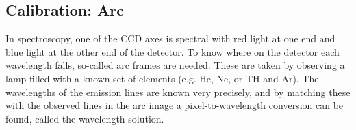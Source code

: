 \documentclass[a4paper,oneside,12pt, class=Latex/Classes/PhDthesisPSnPDF, crop=false]{standalone}
\begin{document}

\subsection{Calibration: Arc}
In spectroscopy, one of the CCD axes is spectral with red light at one end and blue light at the other end of the detector. To know where on the detector each wavelength falls, so-called arc frames are needed. These are taken by observing a lamp filled with a known set of elements (e.g. He, Ne, or TH and Ar). The wavelengths of the emission lines are known very precisely, and by matching these with the observed lines in the arc image a pixel-to-wavelength conversion can be found, called the wavelength solution.

\end{document}

